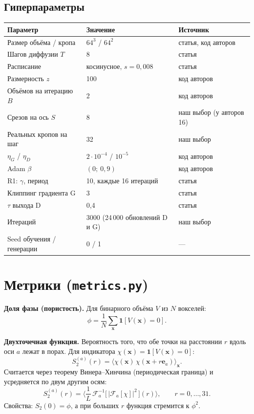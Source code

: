 \documentclass[11pt,a4paper]{article}
\newcommand{\code}[1]{\texttt{#1}}
\begin{document}
\subsection{Гиперпараметры}
\begin{center}
\small
\begin{tabular}{@{}lll@{}}
\toprule
Параметр & Значение & Источник \\
\midrule
Размер объёма / кропа & $64^3$ / $64^2$ & статья, код авторов \\
Шагов диффузии $T$ & 8 & статья \\
Расписание & косинусное, $s=0{,}008$ & статья \\
Размерность $z$ & 100 & код авторов \\
Объёмов на итерацию $B$ & 2 & код авторов \\
Срезов на ось $S$ & 8 & наш выбор (у авторов 16) \\
Реальных кропов на шаг & 32 & наш выбор \\
$\eta_G$ / $\eta_D$ & $2\cdot10^{-4}$ / $10^{-5}$ & код авторов \\
Adam $\beta$ & $(0;\ 0{,}9)$ & код авторов \\
R1: $\gamma$, период & 10, каждые 16 итераций & статья \\
Клиппинг градиента G & 3 & статья \\
$\tau$ выхода D & 0{,}4 & статья \\
Итераций & 3000 (24\,000 обновлений D и G) & наш выбор \\
Seed обучения / генерации & 0 / 1 & — \\
\bottomrule
\end{tabular}
\end{center}

\section{Метрики (\code{metrics.py})}

\textbf{Доля фазы (пористость).} Для бинарного объёма $V$ из $N$ вокселей:
\[
  \phi = \frac1N\sum_{\mathbf x}\mathbf{1}[V(\mathbf x)=0].
\]

\textbf{Двухточечная функция.} Вероятность того, что обе точки на расстоянии $r$ вдоль оси $a$ лежат в
порах. Для индикатора $\chi(\mathbf x)=\mathbf{1}[V(\mathbf x)=0]$:
\[
  S_2^{(a)}(r) = \big\langle \chi(\mathbf x)\,\chi(\mathbf x + r\mathbf e_a)\big\rangle_{\mathbf x}.
\]
Считается через теорему Винера–Хинчина (периодическая граница) и усредняется по двум другим осям:
\[
  S_2^{(a)}(r) = \Big\langle \frac1{L}\,\mathcal F_a^{-1}\big[\,|\mathcal F_a[\chi]|^2\,\big](r)\Big\rangle,\qquad r=0,\dots,31.
\]
Свойства: $S_2(0)=\phi$, а при больших $r$ функция стремится к $\phi^2$.
\end{document}
